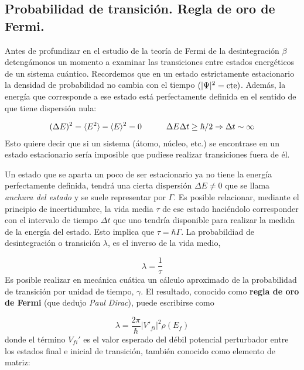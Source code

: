 \subsection{Probabilidad de transición. Regla de oro de Fermi.}

Antes de profundizar en el estudio de la teoría de Fermi de la desintegración $\beta$ detengámonos un momento a examinar las transiciones entre estados energéticos de un sistema cuántico. Recordemos que en un estado estrictamente estacionario la densidad de probabilidad no cambia con el tiempo $(|\Psi|^2 = \text{cte})$. Además, la energía que corresponde a ese estado está perfectamente definida en el sentido de que tiene dispersión nula:

\begin{eqnarray}
	(\Delta E)^2 = \langle E^2 \rangle - \langle E \rangle^2 = 0 \quad \quad \quad \Delta E \Delta t \geq \hbar / 2 \Rightarrow \Delta t \sim \infty
\end{eqnarray}
Esto quiere decir que si un sistema (átomo, núcleo, etc.) se encontrase en un estado estacionario sería imposible que pudiese realizar transiciones fuera de él. %


Un estado que se aparta un poco de ser estacionario ya no tiene la energía perfectamente definida, tendrá una cierta dispersión $\Delta E \neq 0$ que se llama \textit{anchura del estado} y se suele representar por $\Gamma$. Es posible relacionar, mediante el principio de incertidumbre, la vida media $\tau$ de ese estado haciéndolo corresponder con el intervalo de tiempo $\Delta t$ que uno tendría disponible para realizar la medida de la energía del estado. Esto implica que $\tau=\hbar \Gamma$. La probabildiad de desintegración o transición $\lambda$, es el inverso de la vida medio,

\begin{equation}
	\lambda = \frac{1}{\tau}
\end{equation}
Es posible realizar en mecánica cuática un cálculo aproximado de la probabilidad de transición por unidad de tiempo, $\gamma$. El resultado, conocido como \textbf{regla de oro de Fermi} (que dedujo \textit{Paul Dirac}), puede escribirse como

\begin{equation}
	\lambda = \frac{2\pi}{\hbar} |V'_{fi}|^2 \rho (E_f)	\label{Ec:02-02-14}
\end{equation}
donde el término $V_{fi}'$ es el valor esperado del débil potencial perturbador entre los estados final e inicial de transición, también conocido como elemento de matriz:

